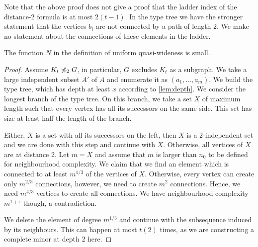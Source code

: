 Note that the above proof does not give a proof that the ladder
index of the distance-$2$ formula is at most $2(t-1)$. In the type
tree we have the stronger statement that the vertices $b_i$
are not connected by a path of length $2$. 
We make no statement about the connections
of these elements in the ladder. 

\begin{theorem}
The function $N$ in the definition of uniform quasi-wideness
is small.
\end{theorem}
\begin{proof}
Assume $K_t\not\preccurlyeq_2G$, in particular, $G$ excludes $K_t$
as a subgraph. We take a large independent subset $A'$ of $A$ and
enumerate it as $(a_1,\ldots, a_m)$. We build the type
tree, which has depth at least $x$ according to \cref{lem:depth}. 
We consider the longest branch of the type tree. On this branch, 
we take a set $X$ of maximum length such that every vertex has 
all its successors on the same side. This set has size at least
half the length of the branch. 

Either, $X$ is a set with all its successors on the left, then $X$ 
is a $2$-independent set and we are done with this step and
continue with $X$. Otherwise, all vertices of $X$ are at distance
$2$. Let $m=X$ and assume that $m$ is larger than $n_0$ to
be defined for neighbourhood complexity.
We claim that we find an element which is connected to at least $m^{1/3}$
of the vertices of $X$. Otherwise, every vertex
can create only $m^{2/3}$ connections, however, we need
to create $m^2$ connections. Hence, we need $m^{4/3}$ vertices
to create all connections. We have neighbourhood complexity
$m^{1+\epsilon}$ though, a contradiction. 

We delete the element of degree $m^{1/3}$ 
and continue with the subsequence
induced by its neighbours. This can happen at most 
$t(2)$ times, as we are constructing a complete minor at 
depth $2$ here. 
\end{proof}

